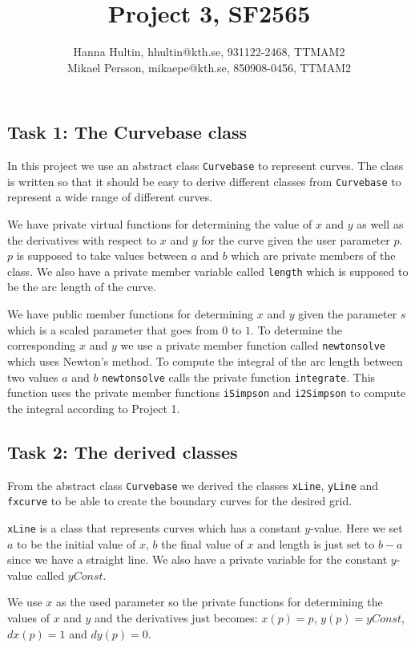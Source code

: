 \documentclass[a4paper,10pt]{article}
\title{Project 3, SF2565}
\author{Hanna Hultin, hhultin@kth.se, 931122-2468, TTMAM2 \\ Mikael Persson, mikaepe@kth.se, 850908-0456, TTMAM2}
\begin{document}
\maketitle
\subsection*{Task 1: The Curvebase class}
In this project we use an abstract class \texttt{Curvebase} to represent curves. The class is written so that it should be easy to derive different classes from \texttt{Curvebase} to represent a wide range of different curves.

We have private virtual functions for determining the value of $x$ and $y$ as well as the derivatives with respect to $x$ and $y$ for the curve given the user parameter $p$. $p$ is supposed to take values between $a$ and $b$ which are private members of the class. We also have a private member variable called \texttt{length} which is supposed to be the arc length of the curve. 

We have public member functions for determining $x$ and $y$ given the parameter $s$ which is a scaled parameter that goes from $0$ to $1$. To determine the corresponding $x$ and $y$ we use a private member function called \texttt{newtonsolve} which uses Newton's method. To compute the integral of the arc length between two values $a$ and $b$ \texttt{newtonsolve} calls the private function \texttt{integrate}. This function uses the private member functions \texttt{iSimpson} and \texttt{i2Simpson} to compute the integral according to Project 1. 

\subsection*{Task 2: The derived classes}
From the abstract class \texttt{Curvebase} we derived the classes \texttt{xLine}, \texttt{yLine} and \texttt{fxcurve} to be able to create the boundary curves for the desired grid.

\texttt{xLine} is a class that represents curves which has a constant $y$-value. Here we set $a$ to be the initial value of $x$, $b$ the final value of $x$ and length is just set to $b-a$ since we have a straight line. We also have a private variable for the constant $y$-value called $yConst$.

We use $x$ as the used parameter so the private functions for determining the values of $x$ and $y$ and the derivatives just becomes: $x(p)=p$, $y(p)=yConst$, $dx(p)=1$ and $dy(p)=0$.
\end{document}

